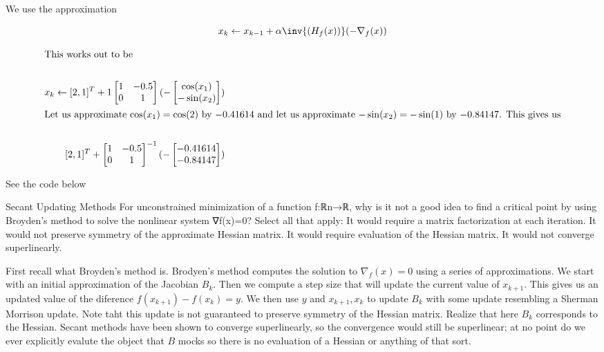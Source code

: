 \documentclass[../main.tex]{subfiles}
\begin{document}

We use the approximation

\[
    x_k \leftarrow x_{k-1} + \alpha \inv{(H_{f}(x))} (-\nabla_{f}(x))
\]

\begin{align*}
    \intertext{This works out to be} \\
    x_k \leftarrow 
    [2, 1]^T + 1 \begin{bmatrix}
        1 & -0.5 \\
        0 & 1 \\
    \end{bmatrix} (- \begin{bmatrix}
        \cos(x_1) \\
        -\sin(x_2) \\
    \end{bmatrix}) \\
    \intertext{Let us approximate $\cos(x_1) = \cos(2)$ by $-0.41614$ and let us approximate $-\sin(x_2) = -\sin(1)$ by $-0.84147$. This gives us} \\ 
    [2, 1]^T + \begin{bmatrix}
        1 & -0.5 \\
        0 & 1 \\
    \end{bmatrix}^{-1} (- \begin{bmatrix}
        -0.41614 \\
        -0.84147 \\
    \end{bmatrix}) \\
\end{align*}

See the code below

Secant Updating Methods
For unconstrained minimization of a function f:ℝn→ℝ, why is it not a good idea to find a critical point by using Broyden's method to solve the nonlinear system ∇f(x)=0?
Select all that apply:
It would require a matrix factorization at each iteration.
It would not preserve symmetry of the approximate Hessian matrix.
It would require evaluation of the Hessian matrix.
It would not converge superlinearly.

\begin{solution}
    First recall what Broyden's method is. Brodyen's method computes the solution to $\nabla_{f}(x) = 0$ using a series of approximations. We start with an initial approximation of the Jacobian $B_k$. Then we compute a step size that will update the current value of $x_{k+1}$. This gives us an updated value of the diference $f(x_{k+1}) - f(x_{k}) = y$. We then use $y$ and $x_{k+1}, x_{k}$ to update $B_k$ with some update resembling a Sherman Morrison update. Note taht this update is not guaranteed to preserve symmetry of the Hessian matrix. Realize that here $B_k$ corresponds to the Hessian. Secant methods have been shown to converge superlinearly, so the convergence would still be superlinear; at no point do we ever explicitly evalute the object that $B$ mocks so there is no evaluation of a Hessian or anything of that sort.
\end{solution}
\end{document}
